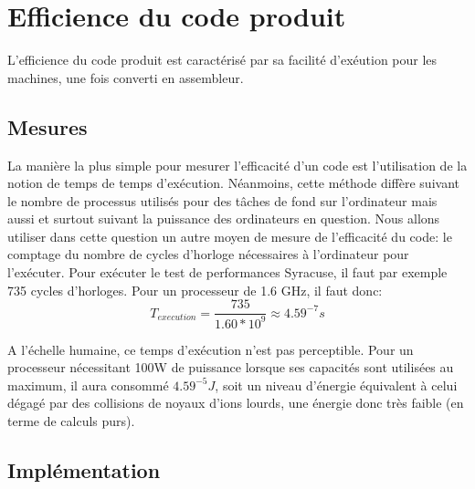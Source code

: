 \documentclass[12pt]{article}
\begin{document}
	

\section{Efficience du code produit}
	L'efficience du code produit est caractérisé par sa facilité d'exéution pour les machines, une fois converti en assembleur.
	
	\subsection{Mesures}
	La manière la plus simple pour mesurer l'efficacité d'un code est l'utilisation de la notion de temps de temps d'exécution. Néanmoins, cette méthode diffère suivant le nombre de processus utilisés pour des tâches de fond sur l'ordinateur mais aussi et surtout suivant la puissance des ordinateurs en question.
	Nous allons utiliser dans cette question un autre moyen de mesure de l'efficacité du code: le comptage du nombre de cycles d'horloge nécessaires à l'ordinateur pour l'exécuter.
	Pour exécuter le test de performances Syracuse, il faut par exemple 735 cycles d'horloges. Pour un processeur de 1.6 GHz, il faut donc:
	\begin{displaymath}
	T_{execution}=\frac{735}{1.60*10^{9}} \approx 4.59^{-7}s
	\end{displaymath}
	
	A l'échelle humaine, ce temps d'exécution n'est pas perceptible. Pour un processeur nécessitant 100W de puissance lorsque ses capacités sont utilisées au maximum, il aura consommé $4.59^{-5} J$, soit un niveau d'énergie équivalent à celui dégagé par des collisions de noyaux d'ions lourds, une énergie donc très faible (en terme de calculs purs).
	
	\subsection{Implémentation}
	
\end{document}
